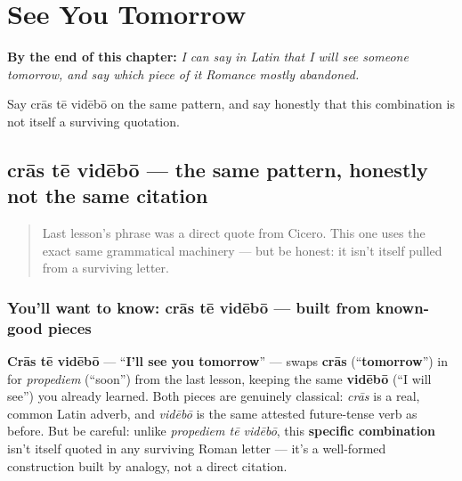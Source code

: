 
\chapter{See You Tomorrow}
\label{ch:la-see-you-tomorrow}

\begin{chapteropening}
\textbf{By the end of this chapter:} \emph{I can say in Latin that I will see someone tomorrow, and say which piece of it Romance mostly abandoned.}

Say crās tē vidēbō on the same pattern, and say honestly that this combination is not itself a surviving quotation.
\end{chapteropening}

\section[crās tē vidēbō]{crās tē vidēbō — the same pattern, honestly not the same citation}

\label{lesson:LA-C25-cras-te-videbo}



\begin{quote}
Last lesson's phrase was a direct quote from Cicero. This one uses the exact same grammatical machinery — but be honest: it isn't itself pulled from a surviving letter.
\end{quote}

\subsection*{You'll want to know: crās tē vidēbō — built from known-good pieces}
\textbf{Crās tē vidēbō} — \textquotedblleft{}\textbf{I'll see you tomorrow}\textquotedblright{} — swaps \textbf{crās} (\textquotedblleft{}\textbf{tomorrow}\textquotedblright{}) in for \emph{propediem} (\textquotedblleft{}soon\textquotedblright{}) from the last lesson, keeping the same \textbf{vidēbō} (\textquotedblleft{}I will see\textquotedblright{}) you already learned. Both pieces are genuinely classical: \emph{crās} is a real, common Latin adverb, and \emph{vidēbō} is the same attested future-tense verb as before. But be careful: unlike \emph{propediem tē vidēbō}, this \textbf{specific combination} isn't itself quoted in any surviving Roman letter — it's a well-formed construction built by analogy, not a direct citation.

